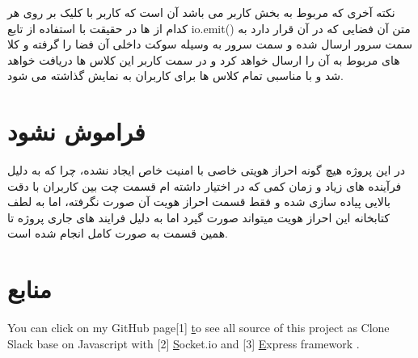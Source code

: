 \documentclass{article}
\begin{document}
نکته آخری که مربوط به بخش کاربر می باشد آن است که کاربر با کلیک بر روی هر کدام از
ها در حقیقت با استفاده از تابع 
io.emit()
متن آن فضایی که در آن قرار دارد به سمت سرور ارسال شده و سمت سرور به وسیله سوکت
داخلی آن فضا را گرفته و کلا های مربوط به آن را ارسال خواهد کرد و در سمت 
کاربر این کلاس ها دریافت خواهد شد و با 
مناسبی تمام کلاس ها برای کاربران به نمایش گذاشته می شود.


\section{فراموش نشود}
در این پروژه هیچ گونه احراز هویتی خاصی با امنیت خاص ایجاد نشده، چرا که 
به دلیل فرآینده های زیاد و زمان کمی که در اختیار داشته ام قسمت چت بین کاربران
با دقت بالایی پیاده سازی شده و فقط قسمت احراز هویت آن صورت نگرفته، اما به لطف کتابخانه
این احراز هویت میتواند صورت گیرد اما به دلیل فرایند های جاری پروژه تا همین قسمت به صورت
کامل انجام شده است.




\newpage
\section*{منابع}

\medskip

\small
\LTR 
\latin


You can click on my GitHub page[1] \href{https://github.com/Asncodes-80/Socket.io/tree/master/slack} to see all source of this project as 
Clone Slack base on Javascript with [2] \href{https://socket.io/} Socket.io 
and [3] \href{http://expressjs.com/}Express framework .
\end{document}
